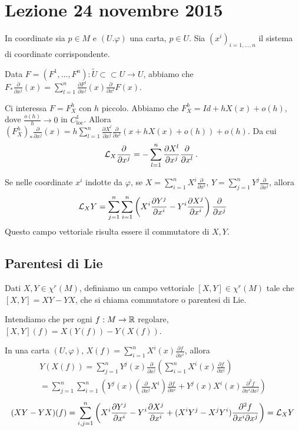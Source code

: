 \chapter{Lezione 24 novembre 2015}

In coordinate sia $p\in M$ e $(U.\varphi)$ una carta, $p\in U$. Sia $(x^i)_{i=1,\ldots,n}$ il sistema di coordinate corrispondente.

Data $F=(F^1,\ldots,F^n):\tilde U \subset\subset U \to U$, abbiamo che $F_*\frac\partial{\partial x^j}(x)=\sum_{l=1}^n \frac{\partial F^l}{\partial x^j}(x)\frac\partial{\partial x^l}F(x)$.

Ci interessa $F=F_X^h$ con $h$ piccolo. Abbiamo che $F_X^h=Id+hX(x)+o(h)$, dove $\frac{o(h)}{h}\to 0$ in $C^1_{\text{loc}}$.
Allora $(F_X^h)_*\frac\partial{\partial x^j}(x)=h\sum_{l=1}^n \frac{\partial X^l}{\partial x^j}\frac\partial{\partial x^l}(x+hX(x)+o(h))+o(h)$.
Da cui
\begin{equation*}
	\mathcal L_X\frac\partial{\partial x^j}=-\sum_{l=1}^n \frac{\partial X^l}{\partial x^j}\frac\partial{\partial x^l}\, \text{. }
\end{equation*}

Se nelle coordinate $x^i$ indotte da $\varphi$, se $X=\sum_{i=1}^n X^i\frac\partial{\partial x^i}$, $Y=\sum_{j=1}^n Y^j\frac\partial{\partial x^j}$, allora
\begin{equation*}
	\mathcal L_XY=\sum_{j=1}^n\sum_{i=1}^n \left(X^i\frac{\partial Y^j}{\partial x^i}-Y^i\frac{\partial X^j}{\partial x^i}\right)\frac\partial{\partial x^j}
\end{equation*}
Questo campo vettoriale risulta essere il commutatore di $X,Y$.

\section{Parentesi di Lie}
\begin{definition}
Dati $X,Y\in\chi^r(M)$, definiamo un campo vettoriale $[X,Y]\in\chi^r(M)$ tale che $[X,Y]=XY-YX$, che si chiama commutatore o parentesi di Lie.

Intendiamo che per ogni $f:M\to\mathbb R$ regolare, $[X,Y](f)=X(Y(f))-Y(X(f))$.
\end{definition}

In una carta $(U,\varphi)$, $X(f)=\sum_{i=1}^n X^i(x)\frac{\partial f}{\partial x^i}$, allora
\begin{multline*}
	Y(X(f))=\sum_{j=1}^nY^j(x)\frac\partial{\partial x^j}\left( \sum_{i=1}^n X^i(x)\frac{\partial f}{\partial x^i} \right)\\
	= \sum_{j=1}^n \sum_{i=1}^n \left( Y^j(x) (\frac{\partial}{\partial x^j}X^i)\frac{\partial f}{\partial x^i} +Y^j(x)X^i(x)\frac{\partial^2 f}{\partial x^i\partial x^j} \right)
\end{multline*}
\begin{equation*}
	(XY-YX)(f)=\sum_{i,j=1}^n\left(X^i\frac{\partial Y^j}{\partial x^i}-Y^i\frac{\partial X^j}{\partial x^i} +(X^iY^j-X^jY^i)\frac{\partial^2 f}{\partial x^i\partial x^j}  \right)=\mathcal L_XY
\end{equation*}

